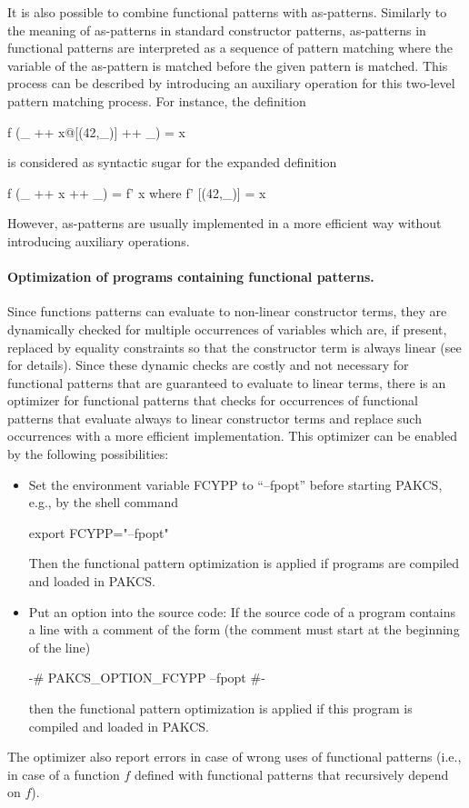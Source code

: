 \documentclass[11pt,fleqn]{article}
\makeatletter
\renewcommand{\tt}{\usefont{OT1}{cmtt}{m}{n}\selectfont}
\newcommand{\codefont}{\tt}
\newcommand{\code}[1]{\mbox{\codefont #1}}
\newcommand{\ccode}[1]{``\mbox{\codefont #1}''}
\newcommand{\pindex}[1]{\index{#1@{\tt #1}}}  %
\makeatother
\begin{document}
It is also possible to combine functional patterns with
as-patterns.\pindex{"@}
Similarly to the meaning of as-patterns
in standard constructor patterns,
as-patterns in functional patterns are interpreted
as a sequence of pattern matching where the variable of the as-pattern
is matched before the given pattern is matched.
This process can be described by introducing an auxiliary operation
for this two-level pattern matching process.
For instance, the definition
\begin{curry}
f (_ ++ x@[(42,_)] ++ _) = x
\end{curry}
is considered as syntactic sugar for the expanded definition
\begin{curry}
f (_ ++ x ++ _) = f' x
 where
  f' [(42,_)] = x
\end{curry}
However, as-patterns are usually implemented
in a more efficient way without introducing auxiliary operations.


\paragraph{Optimization of programs containing functional patterns.}
Since functions patterns can evaluate to non-linear constructor terms,
they are dynamically checked for multiple occurrences of
variables which are, if present, replaced by equality constraints
so that the constructor term is always linear
(see \cite{AntoyHanus05LOPSTR} for details).
Since these dynamic checks are costly and not necessary for
functional patterns that are guaranteed to evaluate to linear terms,
there is an optimizer for functional patterns that checks
for occurrences of functional patterns that evaluate always to
linear constructor terms and replace such occurrences
with a more efficient implementation.
This optimizer can be enabled by the following possibilities:
\begin{itemize}
\item
Set the environment variable \code{FCYPP} to \ccode{--fpopt}
before starting PAKCS, e.g., by the shell command
\begin{curry}
export FCYPP="--fpopt"
\end{curry}
Then the functional pattern optimization is applied if programs are compiled
and loaded in PAKCS.
\item
Put an option into the source code:
If the source code of a program
contains a line with a comment of the form (the comment
must start at the beginning of the line)
\begin{curry}
{-# PAKCS_OPTION_FCYPP --fpopt #-}
\end{curry}
then the functional pattern optimization is applied
if this program is compiled and loaded in PAKCS.
\end{itemize}
The optimizer also report errors in case of wrong uses of functional patterns
(i.e., in case of a function $f$ defined with functional patterns that
recursively depend on $f$).
\end{document}
